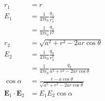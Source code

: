 \documentclass{article}
\renewcommand{\vec}[1]{\boldsymbol{\mathbf{#1}}}
\newcommand{\ke}{\frac{1}{4 \pi \epsilon_0}}
\begin{document}
\subsection{}

\begin{align*}
  r_1                                                & = r                                                                                                                                                                                                           \\
  E_1                                                & = \ke \frac{q_1}{r_1^2}                                                                                                                                                                                       \\
                                                     & = \ke \frac{q_1}{r^2}                                                                                                                                                                                         \\
  r_2                                                & = \sqrt{a^2 + r^2 - 2 a r \cos \theta}                                                                                                                                                                        \\
  E_2                                                & = \ke \frac{q_2}{r_2^2}                                                                                                                                                                                       \\
                                                     & = \ke \frac{q_2}{a^2 + r^2 - 2 a r \cos \theta}                                                                                                                                                               \\
  \cos \alpha                                        & = \frac{r - a \cos \theta}{\sqrt{a^2 + r^2 - 2 a r \cos \theta}}                                                                                                                                              \\
  \vec{E}_1 \cdot \vec{E}_2                          & = E_1 E_2 \cos \alpha                                                                                                                                                                                         \\

\end{align*}
\end{document}

